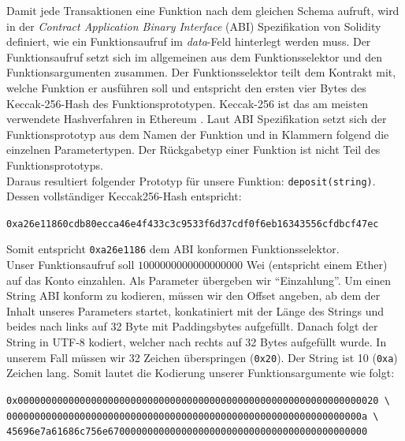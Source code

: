 \documentclass[runningheads]{llncs}
\begin{document}
Damit jede Transaktionen eine Funktion nach dem gleichen Schema aufruft, wird in der \textit{Contract Application Binary Interface} (ABI) Spezifikation von Solidity definiert, wie ein Funktionsaufruf im \textit{data}-Feld hinterlegt werden muss. \cite{noauthor_contract_nodate}
Der Funktionsaufruf setzt sich im allgemeinen aus dem Funktionsselektor und den Funktionsargumenten zusammen. Der Funktionsselektor teilt dem Kontrakt mit, welche Funktion er ausführen soll und entspricht den ersten vier Bytes des Keccak-256-Hash des Funktionsprototypen. Keccak-256 ist das am meisten verwendete Hashverfahren in Ethereum \cite[S. 3]{wood_ethereum/yellowpaper_2019}. Laut ABI Spezifikation setzt sich der Funktionsprototyp aus dem Namen der Funktion und in Klammern folgend die einzelnen Parametertypen. Der Rückgabetyp einer Funktion ist nicht Teil des Funktionsprototyps.\\
Daraus resultiert folgender Prototyp für unsere Funktion: \verb+deposit(string)+.
Dessen vollständiger Keccak256-Hash entspricht:

\begingroup
\fontsize{8pt}{10pt}\selectfont
\begin{center}
  \verb+0xa26e11860cdb80ecca46e4f433c3c9533f6d37cdf0f6eb16343556cfdbcf47ec+
\end{center}
\endgroup

Somit entspricht \verb+0xa26e1186+ dem ABI konformen Funktionsselektor.\\
Unser Funktionsaufruf soll $1000000000000000000$ Wei (entspricht einem Ether) auf das Konto einzahlen. Als Parameter übergeben wir "`Einzahlung"'. Um einen String ABI konform zu kodieren, müssen wir den Offset angeben, ab dem der Inhalt unseres Parameters startet, konkatiniert mit der Länge des Strings und beides nach links auf 32 Byte mit Paddingsbytes aufgefüllt. Danach folgt der String in UTF-8 kodiert, welcher nach rechts auf 32 Bytes aufgefüllt wurde. In unserem Fall müssen wir 32 Zeichen überspringen (\texttt{0x20}). Der String ist 10 (\texttt{0xa}) Zeichen lang. Somit lautet die Kodierung unserer Funktionsargumente wie folgt:

\begingroup
\fontsize{8pt}{10pt}\selectfont
\begin{center}
  \texttt{0x0000000000000000000000000000000000000000000000000000000000000020 \textbackslash} \\
  \texttt{000000000000000000000000000000000000000000000000000000000000000a \textbackslash} \\
  \texttt{45696e7a61686c756e6700000000000000000000000000000000000000000000}
\end{center}
\endgroup
\end{document}
